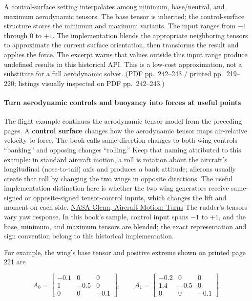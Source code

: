 A control-surface setting interpolates among minimum, base/neutral, and maximum aerodynamic tensors. The base tensor is inherited; the control-surface structure stores the minimum and maximum variants. The input ranges from \(-1\) through \(0\) to \(+1\). The implementation blends the appropriate neighboring tensors to approximate the current surface orientation, then transforms the result and applies the force. The excerpt warns that values outside this input range produce undefined results in this historical API. This is a low-cost approximation, not a substitute for a full aerodynamic solver. (PDF pp.~242--243 / printed pp.~219--220; listings visually inspected on PDF pp.~242--243.)

\paragraph{Turn aerodynamic controls and buoyancy into forces at useful points}\label{06-engine-ii-ch033-turn-aerodynamic-controls-and-buoyancy-into-forces-at-useful-points}

The flight example continues the aerodynamic tensor model from the preceding pages. A \textbf{control surface} changes how the aerodynamic tensor maps air-relative velocity to force. The book calls same-direction changes to both wing controls ``banking'' and opposing changes ``rolling.'' Keep that naming attributed to this example: in standard aircraft motion, a roll is rotation about the aircraft's longitudinal (nose-to-tail) axis and produces a bank attitude; ailerons usually create that roll by changing the two wings in opposite directions. The useful implementation distinction here is whether the two wing generators receive same-signed or opposite-signed tensor-control inputs, which changes the lift and moment on each side. \href{https://www1.grc.nasa.gov/beginners-guide-to-aeronautics/aircraft-motion-turns/}{NASA Glenn, Aircraft Motion: Turns} The rudder's tensors vary yaw response. In this book's sample, control input spans \(-1\) to \(+1\), and the base, minimum, and maximum tensors are blended; the exact representation and sign convention belong to this historical implementation.

For example, the wing's base tensor and positive extreme shown on printed page 221 are

\[
A_0=\begin{bmatrix}-0.1&0&0\\1&-0.5&0\\0&0&-0.1\end{bmatrix},\qquad
A_1=\begin{bmatrix}-0.2&0&0\\1.4&-0.5&0\\0&0&-0.1\end{bmatrix}.
\]

